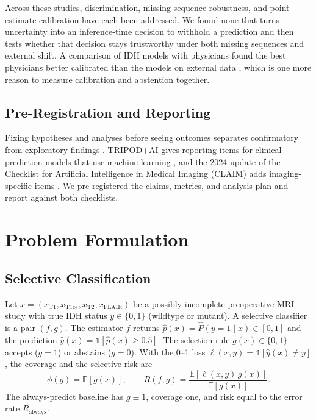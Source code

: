 \documentclass[journal]{IEEEtran}
\begin{document}
Across these studies, discrimination, missing-sequence robustness, and point-estimate calibration have each been addressed. We found none that turns uncertainty into an inference-time decision to withhold a prediction and then tests whether that decision stays trustworthy under both missing sequences and external shift. A comparison of IDH models with physicians found the best physicians better calibrated than the models on external data \cite{takahashi2026}, which is one more reason to measure calibration and abstention together.

\subsection{Pre-Registration and Reporting}
Fixing hypotheses and analyses before seeing outcomes separates confirmatory from exploratory findings \cite{nosek2018}. TRIPOD+AI gives reporting items for clinical prediction models that use machine learning \cite{collins2024}, and the 2024 update of the Checklist for Artificial Intelligence in Medical Imaging (CLAIM) adds imaging-specific items \cite{tejani2024}. We pre-registered the claims, metrics, and analysis plan and report against both checklists.

\section{Problem Formulation}
\label{sec:formal}

\subsection{Selective Classification}
Let $x=(x_{\mathrm{T1}},x_{\mathrm{T1ce}},x_{\mathrm{T2}},x_{\mathrm{FLAIR}})$ be a possibly incomplete preoperative MRI study with true IDH status $y\in\{0,1\}$ (wildtype or mutant). A selective classifier is a pair $(f,g)$. The estimator $f$ returns $\hat p(x)=\hat P(y=1\mid x)\in[0,1]$ and the prediction $\hat y(x)=\mathbb{1}[\hat p(x)\ge 0.5]$. The selection rule $g(x)\in\{0,1\}$ accepts ($g=1$) or abstains ($g=0$). With the 0--1 loss $\ell(x,y)=\mathbb{1}[\hat y(x)\ne y]$, the coverage and the selective risk are
\begin{equation}
\phi(g)=\mathbb{E}[g(x)],\qquad R(f,g)=\frac{\mathbb{E}[\ell(x,y)\,g(x)]}{\mathbb{E}[g(x)]}.
\label{eq:risk}
\end{equation}
The always-predict baseline has $g\equiv1$, coverage one, and risk equal to the error rate $R_{\mathrm{always}}$.
\end{document}
